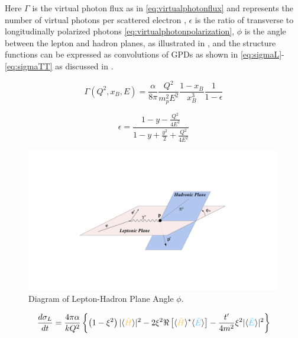              Here $\Gamma$ is the virtual photon flux as in \eqref{eq:virtualphotonflux} and represents the number of virtual photons per scattered electron \parencite{Amaldi1979Pion-electroproduction}, $\epsilon$ is the ratio of transverse to longitudinally polarized photons \eqref{eq:virtualphotonpolarization}, $\phi$ is the angle between the lepton and hadron planes, as illustrated in , and the structure functions can be expressed as convolutions of GPDs as shown in \eqref{eq:sigmaL}-\eqref{eq:sigmaTT} as discussed in \parencite{Bedlinskiy2014ExclusiveCLAS}. 
  
    
            \begin{equation}\label{eq:virtualphotonflux}
                         \Gamma (Q^2, x_B, E) = \frac{\alpha}{8\pi} \frac{Q^2}{m^2_pE^2}\frac{1-x_B}{x_B^3}\frac{1}{1-\epsilon}
            \end{equation}
        
            \begin{equation}\label{eq:virtualphotonpolarization}
                \epsilon = \frac{1 - y - \frac{Q^2}{4E^2}}{1 - y + \frac{y^2}{2} + \frac{Q^2}{4E^2}}
            \end{equation}\label{Virtual Photon Polarization}

            \begin{figure}[H]
                \centering
                \includegraphics[width=0.99\textwidth]{Chapters/Ch1-Intro/Ch1-Sec2-GPDs-DVMP/pics/lept_had_planes.png}
                \caption{Diagram of Lepton-Hadron Plane Angle $\phi$.}
                \label{fig:phi_trento}
            \end{figure}
    
        
         \begin{equation}\label{eq:sigmaL}
                 \textcolor{sigmaL}{\frac{d\sigma_{L}}{dt}} = 
                \frac{4\pi\alpha}{kQ^2}\left\{ \left( 1 - \xi^2 \right) 
                \lvert \langle \GPDHtildeEQ \rangle \rvert ^2 
                -2\xi^2 \Re \left[  \langle \GPDHtildeEQ \rangle ^* \langle \GPDEtildeEQ \rangle    \right] - \frac{t'}{4m^2}\xi^2
                \lvert \langle \GPDEtildeEQ \rangle \rvert ^2  \right\}
            \end{equation} 
        
